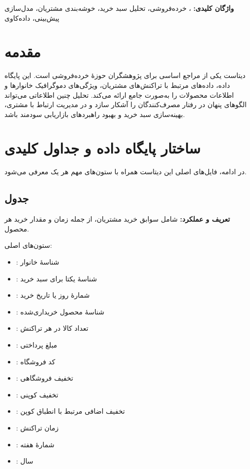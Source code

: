 \documentclass[12pt]{article}
\begin{document}
\noindent\textbf{واژگان کلیدی:} ، خرده‌فروشی، تحلیل سبد خرید، خوشه‌بندی مشتریان، مدل‌سازی پیش‌بینی، داده‌کاوی

\newpage
\tableofcontents
\newpage
{}

\section{\textbf{مقدمه}}
\indent دیتاست  یکی از مراجع اساسی برای پژوهشگران حوزهٔ خرده‌فروشی است. این پایگاه داده، داده‌های مرتبط با تراکنش‌های مشتریان، ویژگی‌های دموگرافیک خانوارها و اطلاعات محصولات را به‌صورت جامع ارائه می‌کند. تحلیل چنین اطلاعاتی می‌تواند الگوهای پنهان در رفتار مصرف‌کنندگان را آشکار سازد و در مدیریت ارتباط با مشتری، بهینه‌سازی سبد خرید و بهبود راهبردهای بازاریابی سودمند باشد.

\section{\textbf{ساختار پایگاه داده و جداول کلیدی}}
\noindent در ادامه، فایل‌های اصلی این دیتاست همراه با ستون‌های مهم هر یک معرفی می‌شود.

\subsection{\textbf{جدول }}
\noindent \textbf{تعریف و عملکرد:} شامل سوابق خرید مشتریان، از جمله زمان و مقدار خرید هر محصول.

\noindent ستون‌های اصلی:
\begin{itemize}
  \item {}: شناسهٔ خانوار
  \item {}: شناسهٔ یکتا برای سبد خرید
  \item {}: شمارهٔ روز یا تاریخ خرید
  \item {}: شناسهٔ محصول خریداری‌شده
  \item {}: تعداد کالا در هر تراکنش
  \item {}: مبلغ پرداختی
  \item {}: کد فروشگاه
  \item {}: تخفیف فروشگاهی
  \item {}: تخفیف کوپنی
  \item {}: تخفیف اضافی مرتبط با انطباق کوپن
  \item {}: زمان تراکنش
  \item {}: شمارهٔ هفته
  \item {}: سال
\end{itemize}
\end{document}
